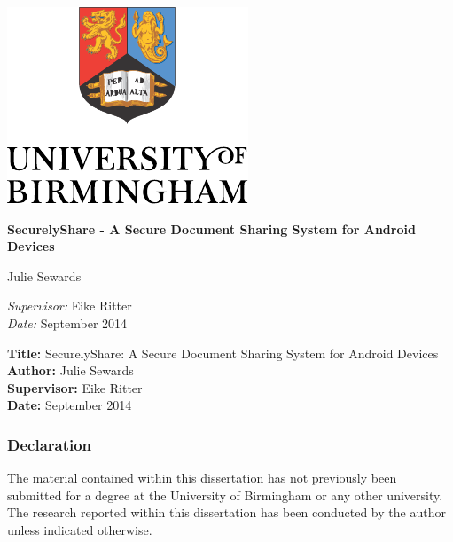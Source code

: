 
\begin{titlepage}
	\begin{center}
		\vspace*{\fill}

		\centering
		\includegraphics[scale=1.3]{Logo.pdf}
		\vfill

	\linespread{1.5}

	{\LARGE\bf SecurelyShare -  A Secure Document Sharing 
			System for  Android Devices\\}


		\vfill
		{\Large Julie Sewards}
		\vfill

		\vfill
		\textit{Supervisor:} Eike Ritter \\
		\vfill
		\textit{Date:} September 2014
		\vfill
		\vfill

	\end{center}
\end{titlepage}

\thispagestyle{empty}

\textbf{Title:} SecurelyShare: A Secure Document Sharing
System for Android Devices\\
\textbf{Author:} Julie Sewards \\
\textbf{Supervisor:} Eike Ritter \\
\textbf{Date:} September 2014 \\
\textbf{}
\vfill
\vfill

\subsubsection*{Declaration}

The material contained within this dissertation has not previously been
submitted for a degree at the University of Birmingham or any other university.
The research reported within this dissertation has been conducted by the author
unless indicated otherwise.\\

